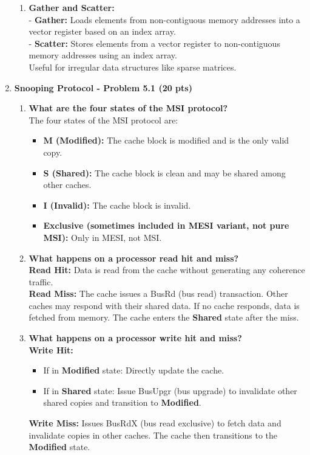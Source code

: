 \documentclass[11pt]{article}
\begin{document}
\begin{enumerate}
\begin{enumerate}[label=\alph*.]
        \item \textbf{Gather and Scatter:} \\
        - \textbf{Gather:} Loads elements from non-contiguous memory addresses into a vector register based on an index array. \\
        - \textbf{Scatter:} Stores elements from a vector register to non-contiguous memory addresses using an index array. \\
        Useful for irregular data structures like sparse matrices.
    \end{enumerate}

    \item \textbf{Snooping Protocol - Problem 5.1 (20 pts)} \\
    \begin{enumerate}[label=\alph*.]
        \item \textbf{What are the four states of the MSI protocol?} \\
        The four states of the MSI protocol are:
        \begin{itemize}
            \item \textbf{M (Modified):} The cache block is modified and is the only valid copy.
            \item \textbf{S (Shared):} The cache block is clean and may be shared among other caches.
            \item \textbf{I (Invalid):} The cache block is invalid.
            \item \textbf{Exclusive (sometimes included in MESI variant, not pure MSI):} Only in MESI, not MSI.
        \end{itemize}

        \item \textbf{What happens on a processor read hit and miss?} \\
        \textbf{Read Hit:} Data is read from the cache without generating any coherence traffic. \\
        \textbf{Read Miss:} The cache issues a BusRd (bus read) transaction. Other caches may respond with their shared data. If no cache responds, data is fetched from memory. The cache enters the \textbf{Shared} state after the miss.

        \item \textbf{What happens on a processor write hit and miss?} \\
        \textbf{Write Hit:}
        \begin{itemize}
            \item If in \textbf{Modified} state: Directly update the cache.
            \item If in \textbf{Shared} state: Issue BusUpgr (bus upgrade) to invalidate other shared copies and transition to \textbf{Modified}.
        \end{itemize}
        \textbf{Write Miss:} Issues BusRdX (bus read exclusive) to fetch data and invalidate copies in other caches. The cache then transitions to the \textbf{Modified} state.
    \end{enumerate}


\end{enumerate}
\end{document}
